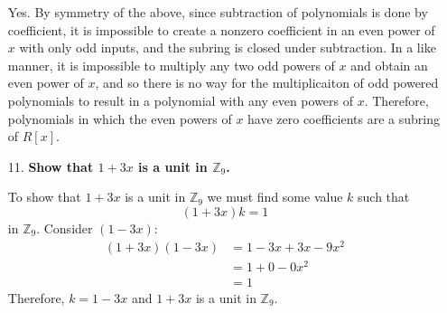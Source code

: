 \documentclass{article}
\begin{document}
\begin{enumerate}
			Yes. By symmetry of the above, since subtraction of polynomials is done by coefficient, 
			it is impossible to create a nonzero coefficient in an even power of $x$ with only odd 
			inputs, and the subring is closed under subtraction. In a like manner, it is impossible 
			to multiply any two odd powers of $x$ and obtain an even power of $x$, and so there is 
			no way for the multiplicaiton of odd powered polynomials to result in a polynomial with 
			any even powers of $x$. Therefore, polynomials in which the even powers of $x$ have zero
			coefficients are a subring of $R[x]$.

		\item [11.] \textbf{Show that $1 + 3x$ is a unit in $\mathbb{Z}_9$.}

			To show that $1 + 3x$ is a unit in $\mathbb{Z}_9$ we must find some value $k$ such that
			\begin{equation*}
				(1 + 3x)k = 1
			\end{equation*}
			in $\mathbb{Z}_9$. Consider $(1 - 3x)$:
			\begin{align*}
				(1 + 3x)(1 - 3x) & = 1 - 3x + 3x - 9x^2 \\
								 & = 1 + 0 - 0x^2 \\
								 & = 1
			\end{align*}
			Therefore, $k = 1 - 3x$ and $1 + 3x$ is a unit in $\mathbb{Z}_9$.

	\end{enumerate}
\end{document}
